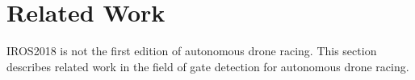 \section{Related Work}
IROS2018 is not the first edition of autonomous drone racing. This section describes related work in the field of gate detection for autonomous drone racing.